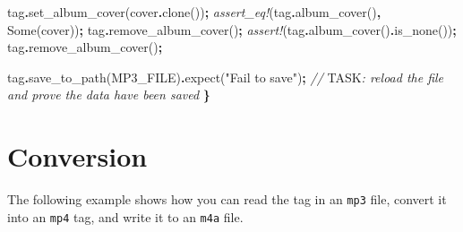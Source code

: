 \documentclass[
]{book}
\newenvironment{Shaded}{\begin{snugshade}}{\end{snugshade}}
\newcommand{\AlertTok}[1]{\textcolor[rgb]{0.94,0.16,0.16}{#1}}
\newcommand{\CommentTok}[1]{\textcolor[rgb]{0.56,0.35,0.01}{\textit{#1}}}
\newcommand{\ConstantTok}[1]{\textcolor[rgb]{0.00,0.00,0.00}{#1}}
\newcommand{\NormalTok}[1]{#1}
\newcommand{\OperatorTok}[1]{\textcolor[rgb]{0.81,0.36,0.00}{\textbf{#1}}}
\newcommand{\PreprocessorTok}[1]{\textcolor[rgb]{0.56,0.35,0.01}{\textit{#1}}}
\newcommand{\StringTok}[1]{\textcolor[rgb]{0.31,0.60,0.02}{#1}}
\begin{document}
\begin{Shaded}
\begin{Highlighting}[]
\NormalTok{    tag}\OperatorTok{.}\NormalTok{set\_album\_cover(cover}\OperatorTok{.}\NormalTok{clone())}\OperatorTok{;}
    \PreprocessorTok{assert\_eq!}\NormalTok{(tag}\OperatorTok{.}\NormalTok{album\_cover()}\OperatorTok{,} \ConstantTok{Some}\NormalTok{(cover))}\OperatorTok{;}
\NormalTok{    tag}\OperatorTok{.}\NormalTok{remove\_album\_cover()}\OperatorTok{;}
    \PreprocessorTok{assert!}\NormalTok{(tag}\OperatorTok{.}\NormalTok{album\_cover()}\OperatorTok{.}\NormalTok{is\_none())}\OperatorTok{;}
\NormalTok{    tag}\OperatorTok{.}\NormalTok{remove\_album\_cover()}\OperatorTok{;}

\NormalTok{    tag}\OperatorTok{.}\NormalTok{save\_to\_path(MP3\_FILE)}\OperatorTok{.}\NormalTok{expect(}\StringTok{"Fail to save"}\NormalTok{)}\OperatorTok{;}
    \CommentTok{// }\AlertTok{TASK}\CommentTok{: reload the file and prove the data have been saved}
\OperatorTok{\}}
\end{Highlighting}
\end{Shaded}

\hypertarget{conversion}{%
\chapter{Conversion}\label{conversion}}

The following example shows how you can read the tag in an \texttt{mp3} file, convert it into an \texttt{mp4} tag, and write it to an \texttt{m4a} file.
\end{document}
